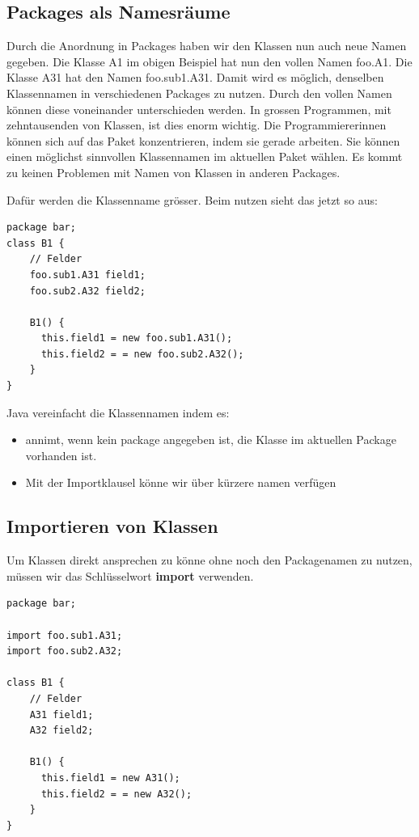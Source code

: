 \documentclass[12pt]{article}
\begin{document}
    \subsection*{Packages als Namesräume}

    Durch die Anordnung in Packages haben wir den Klassen nun auch neue Namen gegeben. Die Klasse A1 im obigen Beispiel hat nun den vollen Namen foo.A1. 
    Die Klasse A31 hat den Namen foo.sub1.A31. Damit wird es möglich, denselben Klassennamen in verschiedenen Packages zu nutzen. 
    Durch den vollen Namen können diese voneinander unterschieden werden. In grossen Programmen, mit zehntausenden von Klassen, ist dies enorm wichtig. 
    Die Programmierer\*innen können sich auf das Paket konzentrieren, indem sie gerade arbeiten. 
    Sie können einen möglichst sinnvollen Klassennamen im aktuellen Paket wählen. 
    Es kommt zu keinen Problemen mit Namen von Klassen in anderen Packages.

    Dafür werden die Klassenname grösser. Beim nutzen sieht das jetzt so aus:

    \begin{lstlisting}[caption=klassen in packages]
package bar; 
class B1 {
    // Felder
    foo.sub1.A31 field1;
    foo.sub2.A32 field2;

    B1() {
      this.field1 = new foo.sub1.A31();
      this.field2 = = new foo.sub2.A32();
    }
}
    \end{lstlisting}

    Java vereinfacht die Klassennamen indem es: 

    \begin{itemize}

        \item annimt, wenn kein package angegeben ist, die Klasse im aktuellen Package vorhanden ist.

        \item Mit der Importklausel könne wir über kürzere namen verfügen

    \end{itemize}

    \subsection*{Importieren von Klassen}


    Um Klassen direkt ansprechen zu könne ohne noch den Packagenamen zu nutzen,
    müssen wir das Schlüsselwort \textbf{import} verwenden. 

    \begin{lstlisting}[caption=import Klassen]
package bar; 

import foo.sub1.A31;
import foo.sub2.A32;

class B1 {
    // Felder
    A31 field1;
    A32 field2;

    B1() {
      this.field1 = new A31();
      this.field2 = = new A32();
    }
}
    \end{lstlisting}
\end{document}
